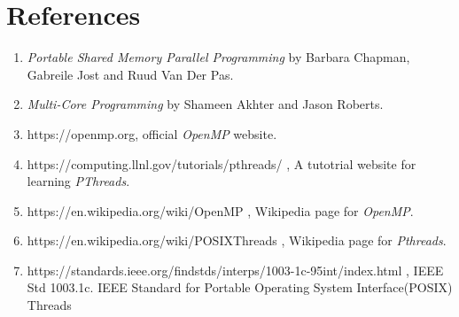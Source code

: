 \documentclass{article}
\begin{document}
\pagebreak
\section{References}

\begin{enumerate}
 \item \textit{Portable Shared Memory Parallel Programming} by Barbara Chapman, Gabreile Jost and Ruud Van Der Pas.

 \item \textit{Multi-Core Programming} by Shameen Akhter and Jason Roberts.

 \item https://openmp.org, official \textit{OpenMP} website.

 \item https://computing.llnl.gov/tutorials/pthreads/ , A tutotrial website for learning \textit{PThreads}.

 \item https://en.wikipedia.org/wiki/OpenMP , Wikipedia page for \textit{OpenMP}.

 \item https://en.wikipedia.org/wiki/POSIXThreads , Wikipedia page for \textit{Pthreads}.

 \item https://standards.ieee.org/findstds/interps/1003-1c-95int/index.html , IEEE Std 1003.1c. IEEE Standard for Portable 
 		Operating System Interface(POSIX) Threads
\end{enumerate}
\end{document}
